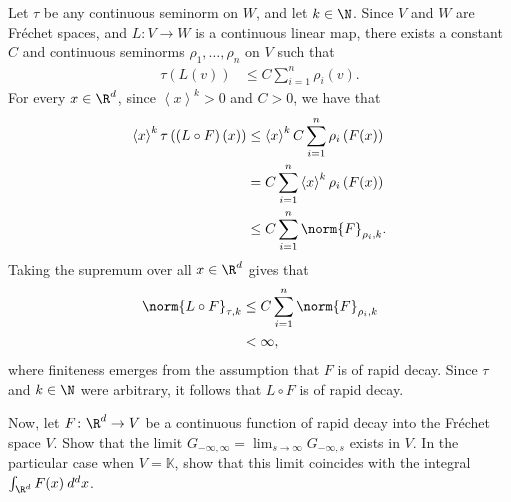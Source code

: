 \documentclass[10pt]{mypackage}
\begin{document}
\begin{solution}
  Let $\tau$ be any continuous seminorm on $W$, and let $k\in \N$. Since $V$ and $W$ are Fréchet spaces, and $L\colon V\to W$ is a continuous linear map, there exists a constant $C$ and continuous seminorms $\rho_1,\dots,\rho_n$ on $V$ such that
  \begin{align*}
    \tau\left( L(v) \right) &\leq C\sum_{i=1}^{n} \rho_i(v).
  \end{align*}
  For every $x\in \R^d$, since $ \left\langle x \right\rangle^{k} > 0 $ and $C > 0$, we have that
  \begin{align*}
    \left\langle x \right\rangle^{k}\tau\left( \left( L\circ F \right)(x) \right) &\leq \left\langle x \right\rangle^{k}C\sum_{i=1}^{n} \rho_i\left( F(x) \right)\\
                                                                                  &= C\sum_{i=1}^{n}\left\langle x \right\rangle^{k}\rho_i\left( F(x) \right)\\
                                                                                  &\leq C\sum_{i=1}^{n} \norm{F}_{\rho_i,k}.
  \end{align*}
  Taking the supremum over all $x\in \R^d$ gives that
  \begin{align*}
    \norm{L\circ F}_{\tau,k} &\leq C\sum_{i=1}^{n}\norm{F}_{\rho_i,k}\\
                             &< \infty,
  \end{align*}
  where finiteness emerges from the assumption that $F$ is of rapid decay. Since $\tau$ and $k\in \N$ were arbitrary, it follows that $L\circ F$ is of rapid decay.
\end{solution}
\begin{problem}[Problem II.8]
  Now, let $F\colon \R^d\to V$ be a continuous function of rapid decay into the Fréchet space $V$. Show that the limit $G_{-\infty,\infty} = \lim_{s\to\infty}G_{-\infty,s}$ exists in $V$. In the particular case when $V = \mathbb{K}$, show that this limit coincides with the integral $ \int_{\R^d}^{} F(x)\:d^{d}x $.
\end{problem}
\end{document}
